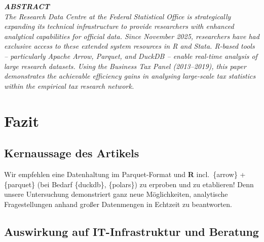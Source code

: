 \documentclass[
  german,
  10pt,
  twoside]{article}
\renewcommand*\contentsname{Inhaltsverzeichnis}
\newcommand\contentsname{Inhaltsverzeichnis}
\begin{document}
\begin{titlepage}
\begin{minipage}[t]{11.8cm}
\vspace{0.3cm}

{\itshape\color{wistaDarkGray}\bfseries\MakeUppercase{Abstract}}\\[0.15cm]
\small\itshape
The Research Data Centre at the Federal Statistical Office is strategically expanding its technical infrastructure to provide researchers with enhanced analytical capabilities for official data. Since November 2025, researchers have had exclusive access to these extended system resources in R and Stata. R-based tools -- particularly Apache Arrow, Parquet, and DuckDB -- enable real-time analysis of large research datasets. Using the Business Tax Panel (2013--2019), this paper demonstrates the achievable efficiency gains in analysing large-scale tax statistics within the empirical tax research network.

\end{minipage}

\vfill

\vspace{0.5cm}
\noindent{}

\end{titlepage}

\pagestyle{fancy}

\renewcommand*\contentsname{Inhaltsverzeichnis}
{
\hypersetup{linkcolor=}
\setcounter{tocdepth}{3}
\tableofcontents
}

\setcounter{subsection}{5}

\section{Fazit}\label{sec-ausblick}

\subsection{Kernaussage des Artikels}\label{kernaussage-des-artikels}

Wir empfehlen eine Datenhaltung im Parquet-Format und \textbf{R}
incl.~\{arrow\} + \{parquet\} (bei Bedarf \{duckdb\}, \{polars\}) zu
erproben und zu etablieren! Denn unsere Untersuchung demonstriert ganz
neue Möglichkeiten, analytische Fragestellungen anhand großer
Datenmengen in Echtzeit zu beantworten.

\subsection{Auswirkung auf IT-Infrastruktur und
Beratung}\label{auswirkung-auf-it-infrastruktur-und-beratung}
\end{document}
